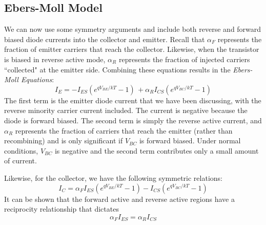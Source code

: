 \subsection{Ebers-Moll Model}
We can now use some symmetry arguments and include both reverse and forward biased diode currents into the collector and emitter.   Recall that $\alpha_F$ represents the fraction of emitter carriers that reach the collector.  Likewise, when the transistor is biased in reverse active mode, $\alpha_R$ represents the fraction of injected carriers ``collected" at the emitter side.  Combining these equations results in the \emph{Ebers-Moll Equations}:
\begin{equation}
	{I_E} =  - {I_{ES}}\left( {{e^{{qV_{BE}}/{kT}}} - 1} \right)\, + {\alpha _R}{I_{CS}}\left( {{e^{{qV_{BC}}/{kT}}} - 1} \right)
\end{equation}
The first term is the emitter diode current that we have been discussing, with the reverse minority carrier current included.  The current is negative because the diode is forward biased.  The second term is simply the reverse active current, and $\alpha_R$ represents the fraction of carriers that reach the emitter (rather than recombining) and is only significant if $V_{BC}$ is forward biased.  Under normal conditions, $V_{BC}$ is negative and the second term contributes only a small amount of current.  

Likewise, for the collector, we have the following symmetric relations:
\begin{equation}
	{I_C} = {\alpha _F}{I_{ES}}\left( {{e^{{qV_{BE}}/{kT}}} - 1} \right) - {I_{CS}}\left( {{e^{{qV_{BC}}/{kT}}} - 1} \right)
\end{equation}
It can be shown that the forward active and reverse active regions have a reciprocity relationship that dictates 
\begin{equation}
	{\alpha _F}{I_{ES}} = {\alpha _R}{I_{CS}}
\end{equation}
